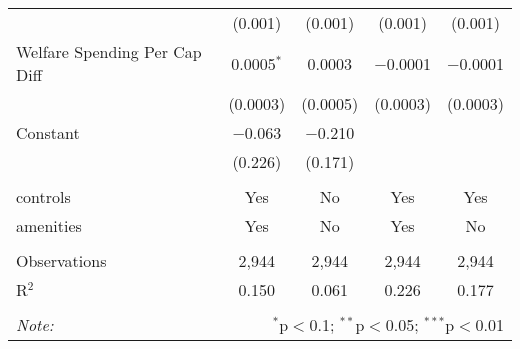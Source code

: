 \begin{table}[!htbp]
\begin{tabular}{@{\extracolsep{5pt}}lcccc}
  & (0.001) & (0.001) & (0.001) & (0.001) \\ 
  Welfare Spending Per Cap Diff & 0.0005$^{*}$ & 0.0003 & $-$0.0001 & $-$0.0001 \\ 
  & (0.0003) & (0.0005) & (0.0003) & (0.0003) \\ 
  Constant & $-$0.063 & $-$0.210 &  &  \\ 
  & (0.226) & (0.171) &  &  \\ 
 \hline \\[-1.8ex] 
controls & Yes & No & Yes & Yes \\ 
amenities & Yes & No & Yes & No \\ 
\hline \\[-1.8ex] 
Observations & 2,944 & 2,944 & 2,944 & 2,944 \\ 
R$^{2}$ & 0.150 & 0.061 & 0.226 & 0.177 \\ 
\hline 
\hline \\[-1.8ex] 
\textit{Note:}  & \multicolumn{4}{r}{$^{*}$p$<$0.1; $^{**}$p$<$0.05; $^{***}$p$<$0.01} \\ 
\end{tabular} 
\end{table} 
